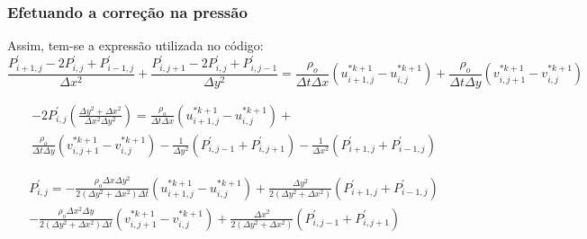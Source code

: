 \documentclass[xcolor=dvipsnames,10pt,aspectratio=169]{beamer}
\begin{document}
	\begin{frame}
		\frametitle{Efetuando a correção na pressão}
		Assim, tem-se a expressão utilizada no código:
		\begin{equation}
			\frac{ P^{\prime}_{i + 1, j} - 2 P^{\prime}_{i , j} + P^{\prime}_{i - 1 , j} }{\Delta x^2} + \frac{ P^{\prime}_{i, j + 1} - 2 P^{\prime}_{i , j} + P^{\prime}_{i , j- 1} }{\Delta y^2} = \frac{\rho_o}{ \Delta t \Delta x} \left(u_{i + 1 , j}^{\ast k + 1} - u_{i , j}^{\ast k + 1} \right) + \frac{\rho_o}{ \Delta t \Delta y } \left( v_{i , j + 1}^{\ast k + 1} - v_{i , j}^{\ast k + 1}\right)
		\end{equation}
		
		\begin{equation}
			\begin{split}
			-2 P^{\prime}_{i , j} \left(   \frac{\Delta y^2 + \Delta x^2}{\Delta x^2 \Delta y^2} \right)  = \frac{\rho_o}{ \Delta t \Delta x} \left(u_{i + 1 , j}^{\ast k + 1} - u_{i , j}^{\ast k + 1} \right) + \\ \frac{\rho_o}{ \Delta t \Delta y } \left( v_{i , j + 1}^{\ast k + 1} - v_{i , j}^{\ast k + 1}\right) - \frac{1}{\Delta y^2} \left(P^{\prime}_{i , j- 1} + P^{\prime}_{i, j + 1} \right) - \frac{1}{\Delta x^2} \left(P^{\prime}_{i + 1, j} +  P^{\prime}_{i - 1 , j}\right) 
			\end{split}
		\end{equation}
		
		\begin{equation}
		\begin{split}
		P^{\prime}_{i , j}  = - \frac{\rho_o \Delta x \Delta y^2 }{ 2 ( \Delta y^2 + \Delta x^2) \Delta t} \left(u_{i + 1 , j}^{\ast k + 1} - u_{i , j}^{\ast k + 1} \right) + \frac{\Delta y^2}{ 2 (\Delta y^2 + \Delta x^2)} \left(P^{\prime}_{i + 1, j} +  P^{\prime}_{i - 1 , j}\right) \\ - \frac{\rho_o \Delta x^2 \Delta y }{ 2 ( \Delta y^2 + \Delta x^2) \Delta t} \left( v_{i , j + 1}^{\ast k + 1} - v_{i , j}^{\ast k + 1}\right) + \frac{\Delta x^2}{ 2 (\Delta y^2 + \Delta x^2)} \left(P^{\prime}_{i , j- 1} + P^{\prime}_{i, j + 1} \right) 
		\end{split}
		\end{equation}
	
	\end{frame}
\end{document}
